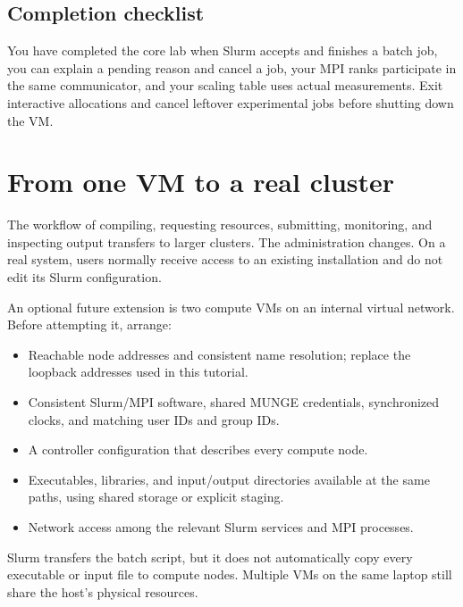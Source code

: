 \documentclass[11pt,a4paper]{article}
\begin{document}
\subsection{Completion checklist}
You have completed the core lab when Slurm accepts and finishes a batch job,
you can explain a pending reason and cancel a job, your MPI ranks participate
in the same communicator, and your scaling table uses actual measurements.
Exit interactive allocations and cancel leftover experimental jobs before
shutting down the VM.

\section{From one VM to a real cluster}
The workflow of compiling, requesting resources, submitting, monitoring,
and inspecting output transfers to larger clusters. The administration
changes. On a real system, users normally receive access to an existing
installation and do not edit its Slurm configuration.

An optional future extension is two compute VMs on an internal virtual
network. Before attempting it, arrange:
\begin{itemize}
\item Reachable node addresses and consistent name resolution; replace
      the loopback addresses used in this tutorial.
\item Consistent Slurm/MPI software, shared MUNGE credentials, synchronized
      clocks, and matching user IDs and group IDs.
\item A controller configuration that describes every compute node.
\item Executables, libraries, and input/output directories available at the
      same paths, using shared storage or explicit staging.
\item Network access among the relevant Slurm services and MPI processes.
\end{itemize}
Slurm transfers the batch script, but it does not automatically copy every
executable or input file to compute nodes. Multiple VMs on the same laptop
still share the host's physical resources.\cite{slurm-admin,slurm-sbatch}
\end{document}
